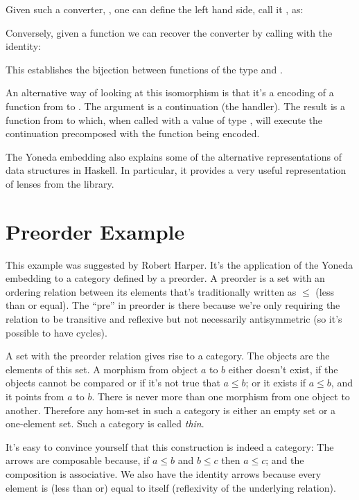 Given such a converter, , one can define the left hand
side, call it , as:

Conversely, given a function  we can recover the converter
by calling  with the identity:

This establishes the bijection between functions of the type
 and .

An alternative way of looking at this isomorphism is that it's a 
encoding of a function from  to . The argument
 is a continuation (the handler). The result
is a function from  to  which, when called with a
value of type , will execute the continuation precomposed with
the function being encoded.

The Yoneda embedding also explains some of the alternative
representations of data structures in Haskell. In particular, it
provides a 
{very useful representation}
of lenses from the  library.

\section{Preorder Example}

This example was suggested by Robert Harper. It's the application of the
Yoneda embedding to a category defined by a preorder. A preorder is a
set with an ordering relation between its elements that's traditionally
written as $\leqslant$ (less than or equal). The ``pre'' in
preorder is there because we're only requiring the relation to be
transitive and reflexive but not necessarily antisymmetric (so it's
possible to have cycles).

A set with the preorder relation gives rise to a category. The objects
are the elements of this set. A morphism from object $a$ to
$b$ either doesn't exist, if the objects cannot be compared or if
it's not true that $a \leqslant b$; or it exists if
$a \leqslant b$, and it points from $a$ to
$b$. There is never more than one morphism from one object to
another. Therefore any hom-set in such a category is either an empty set
or a one-element set. Such a category is called \emph{thin}.

It's easy to convince yourself that this construction is indeed a
category: The arrows are composable because, if
$a \leqslant b$ and $b \leqslant c$ then
$a \leqslant c$; and the composition is associative. We also
have the identity arrows because every element is (less than or) equal
to itself (reflexivity of the underlying relation).

